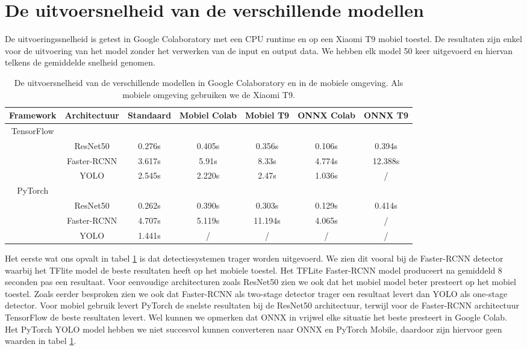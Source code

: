 \section{De uitvoersnelheid van de verschillende modellen}
De uitvoeringssnelheid is getest in Google Colaboratory met een CPU runtime en op een Xiaomi T9 mobiel toestel.
De resultaten zijn enkel voor de uitvoering van het model zonder het verwerken van de input en output data.
We hebben elk model 50 keer uitgevoerd en hiervan telkens de gemiddelde snelheid genomen.

\begin{table}[!ht]
    \caption{De uitvoersnelheid van de verschillende modellen in Google Colaboratory en in de mobiele omgeving. Als mobiele omgeving gebruiken we de Xiaomi T9.}
\begin{tabular}{ccccccc}
    \hline
    Framework & Architectuur & Standaard & Mobiel Colab & Mobiel T9 & ONNX Colab & ONNX T9\\
    \hline
    TensorFlow & & & & \\
     & ResNet50 & 0.276s & 0.405s & 0.356s & 0.106s & 0.394s \\
     & Faster-RCNN & 3.617s & 5.91s & 8.33s & 4.774s & 12.388s \\
     & YOLO & 2.545s & 2.220s & 2.47s & 1.036s & / \\
    PyTorch & & & & \\
    & ResNet50 & 0.262s & 0.390s & 0.303s & 0.129s & 0.414s \\
    & Faster-RCNN & 4.707s & 5.119s & 11.194s & 4.065s & / \\
    & YOLO & 1.441s & / & / & / & / \\
    \hline
\end{tabular}
\label{tab:speed}
\end{table}

Het eerste wat ons opvalt in tabel \ref{tab:speed} is dat detectiesystemen trager worden uitgevoerd.
We zien dit vooral bij de Faster-RCNN detector waarbij het TFlite model de beste resultaten heeft op het mobiele toestel.
Het TFLite Faster-RCNN model produceert na gemiddeld 8 seconden pas een resultaat.
Voor eenvoudige architecturen zoals ResNet50 zien we ook dat het mobiel model beter presteert op het mobiel toestel.
Zoals eerder besproken zien we ook dat Faster-RCNN als two-stage detector trager een resultaat levert dan YOLO als one-stage detector.
Voor mobiel gebruik levert PyTorch de snelste resultaten bij de ResNet50 architectuur, terwijl voor de Faster-RCNN architectuur TensorFlow de beste resultaten levert.
Wel kunnen we opmerken dat ONNX in vrijwel elke situatie het beste presteert in Google Colab.
Het PyTorch YOLO model hebben we niet succesvol kunnen converteren naar ONNX en PyTorch Mobile, daardoor zijn hiervoor geen waarden in tabel \ref{tab:speed}.

